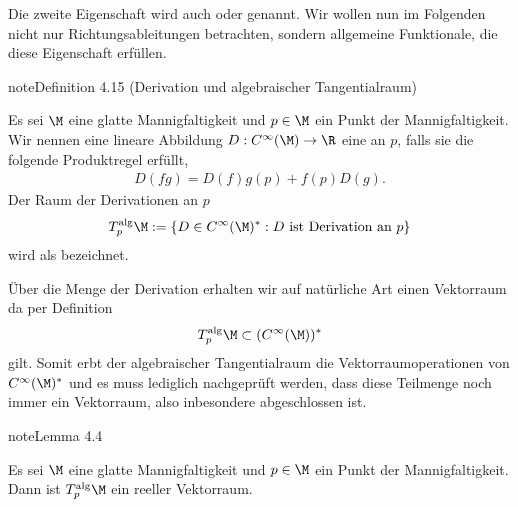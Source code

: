 \documentclass[letterpaper,10pt,english]{jupyterBook}
\begin{document}
\sphinxAtStartPar
Die zweite Eigenschaft wird auch  oder  genannt.
Wir wollen nun im Folgenden nicht nur Richtungsableitungen betrachten, sondern allgemeine Funktionale, die diese Eigenschaft erfüllen.
\label{manifolds/tangential:definition-8}
\begin{sphinxadmonition}{note}{Definition 4.15 (Derivation und algebraischer Tangentialraum)}



\sphinxAtStartPar
Es sei \(\M\) eine glatte Mannigfaltigkeit und \(p\in\M\) ein Punkt der Mannigfaltigkeit.
Wir nennen eine lineare Abbildung \(D: C^\infty(\M) \to \R\) eine  an \(p\), falls sie die folgende Produktregel erfüllt,
\begin{equation*}
\begin{split}D(fg) = D(f) g(p) + f(p) D(g).\end{split}
\end{equation*}
\sphinxAtStartPar
Der Raum der Derivationen an \(p\)
\begin{equation*}
\begin{split}T^{\text{alg}}_p\M := \{D\in C^\infty(\M)^\ast: D\text{ ist Derivation an }p\}\end{split}
\end{equation*}
\sphinxAtStartPar
wird als  bezeichnet.
\end{sphinxadmonition}

\sphinxAtStartPar
Über die Menge der Derivation erhalten wir auf natürliche Art einen Vektorraum da per Definition
\begin{equation*}
\begin{split}T^{\text{alg}}_p\M \subset (C^\infty(\M))^\ast\end{split}
\end{equation*}
\sphinxAtStartPar
gilt.
Somit erbt der algebraischer Tangentialraum die Vektorraumoperationen von \(C^\infty(\M)^\ast\) und es muss lediglich nachgeprüft werden, dass diese Teilmenge noch immer ein Vektorraum, also inbesondere abgeschlossen ist.
\label{manifolds/tangential:lemma-9}
\begin{sphinxadmonition}{note}{Lemma 4.4}



\sphinxAtStartPar
Es sei \(\M\) eine glatte Mannigfaltigkeit und \(p\in\M\) ein Punkt der Mannigfaltigkeit.
Dann ist \(T^{\text{alg}}_p\M\) ein reeller Vektorraum.
\end{sphinxadmonition}
\end{document}
